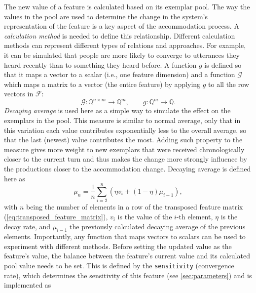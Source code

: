 The new value of a feature is calculated based on its exemplar pool.
The way the values in the pool are used to determine the change in the system's representation of the feature is a key aspect of the accommodation process.
A \textit{calculation method} is needed to define this relationship.
Different calculation methods can represent different types of relations and approaches.
For example, it can be simulated that people are more likely to converge to utterances they heard recently than to something they heard before.
A function $g$ is defined so that it maps a vector to a scalar (i.e., one feature dimension) and a function $\mathcal{G}$ which maps a matrix to a vector (the entire feature) by applying $g$ to all the row vectors in $\mathcal{F}$:
%
\begin{equation}
	\label{eq:matrix2vec}
	\mathcal{G}: \mathbb{Q}^{n \times m} \longrightarrow \mathbb{Q}^{m}, \qquad g: \mathbb{Q}^{m} \longrightarrow \mathbb{Q}.
\end{equation}
%
\textit{Decaying average} is used here as a simple way to simulate the effect on the exemplars in the pool.
This measure is similar to normal average, only that in this variation each value contributes exponentially less to the overall average, so that the last (newest) value contributes the most.
Adding such property to the measure gives more weight to new exemplars that were received chronologically closer to the current turn and thus makes the change more strongly influence by the productions closer to the accommodation change.
Decaying average is defined here as
\begin{equation}
	\label{eq:decaying_average}
	\mu_n = \frac{1}{n}\sum_{i = 2}^{n}(\eta v_i + (1 - \eta )\mu_{i-1}),
\end{equation}
%
with $n$ being the number of elements in a row of the transposed feature matrix (\cref{eq:transposed_feature_matrix}), $v_i$ is the value of the $i$-th element, $\eta$ is the decay rate, and $\mu_{i-1}$ the previously calculated decaying average of the previous elements.
Importantly, any function that maps vectors to scalars can be used to experiment with different methods.
Before setting the updated value as the feature's value, the balance between the feature's current value and its calculated pool value needs to be set.
This is defined by the \texttt{sensitivity} (convergence rate), which determines the sensitivity of this feature (see \cref{sec:parameters}) and is implemented as
